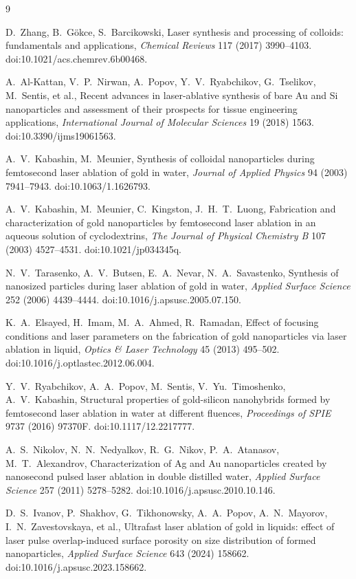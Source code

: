 \documentclass[english]{ai4science_ysda}
\begin{document}
\begin{thebibliography}{9}

D.~Zhang, B.~G\"okce, S.~Barcikowski,
Laser synthesis and processing of colloids: fundamentals and applications,
\emph{Chemical Reviews} 117 (2017) 3990--4103.
doi:10.1021/acs.chemrev.6b00468.

A.~Al-Kattan, V.~P.~Nirwan, A.~Popov, Y.~V.~Ryabchikov, G.~Tselikov, M.~Sentis,
et al.,
Recent advances in laser-ablative synthesis of bare Au and Si nanoparticles and
assessment of their prospects for tissue engineering applications,
\emph{International Journal of Molecular Sciences} 19 (2018) 1563.
doi:10.3390/ijms19061563.

A.~V.~Kabashin, M.~Meunier,
Synthesis of colloidal nanoparticles during femtosecond laser ablation of gold
in water,
\emph{Journal of Applied Physics} 94 (2003) 7941--7943.
doi:10.1063/1.1626793.

A.~V.~Kabashin, M.~Meunier, C.~Kingston, J.~H.~T.~Luong,
Fabrication and characterization of gold nanoparticles by femtosecond laser
ablation in an aqueous solution of cyclodextrins,
\emph{The Journal of Physical Chemistry B} 107 (2003) 4527--4531.
doi:10.1021/jp034345q.

N.~V.~Tarasenko, A.~V.~Butsen, E.~A.~Nevar, N.~A.~Savastenko,
Synthesis of nanosized particles during laser ablation of gold in water,
\emph{Applied Surface Science} 252 (2006) 4439--4444.
doi:10.1016/j.apsusc.2005.07.150.

K.~A.~Elsayed, H.~Imam, M.~A.~Ahmed, R.~Ramadan,
Effect of focusing conditions and laser parameters on the fabrication of gold
nanoparticles via laser ablation in liquid,
\emph{Optics \& Laser Technology} 45 (2013) 495--502.
doi:10.1016/j.optlastec.2012.06.004.

Y.~V.~Ryabchikov, A.~A.~Popov, M.~Sentis, V.~Yu.~Timoshenko, A.~V.~Kabashin,
Structural properties of gold-silicon nanohybrids formed by femtosecond laser
ablation in water at different fluences,
\emph{Proceedings of SPIE} 9737 (2016) 97370F.
doi:10.1117/12.2217777.

A.~S.~Nikolov, N.~N.~Nedyalkov, R.~G.~Nikov, P.~A.~Atanasov, M.~T.~Alexandrov,
Characterization of Ag and Au nanoparticles created by nanosecond pulsed laser
ablation in double distilled water,
\emph{Applied Surface Science} 257 (2011) 5278--5282.
doi:10.1016/j.apsusc.2010.10.146.

D.~S.~Ivanov, P.~Shakhov, G.~Tikhonowsky, A.~A.~Popov, A.~N.~Mayorov,
I.~N.~Zavestovskaya, et al.,
Ultrafast laser ablation of gold in liquids: effect of laser pulse
overlap-induced surface porosity on size distribution of formed nanoparticles,
\emph{Applied Surface Science} 643 (2024) 158662.
doi:10.1016/j.apsusc.2023.158662.

\end{thebibliography}
\end{document}
